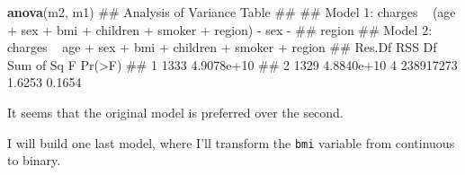 \documentclass[]{article}
\newenvironment{Shaded}{\begin{snugshade}}{\end{snugshade}}
\newcommand{\KeywordTok}[1]{\textcolor[rgb]{0.13,0.29,0.53}{\textbf{#1}}}
\newcommand{\NormalTok}[1]{#1}
\begin{document}
\begin{Shaded}
\begin{Highlighting}[]
\KeywordTok{anova}\NormalTok{(m2, m1)}
\NormalTok{## Analysis of Variance Table}
\NormalTok{## }
\NormalTok{## Model 1: charges ~ (age + sex + bmi + children + smoker + region) - sex - }
\NormalTok{##     region}
\NormalTok{## Model 2: charges ~ age + sex + bmi + children + smoker + region}
\NormalTok{##   Res.Df        RSS Df Sum of Sq      F Pr(>F)}
\NormalTok{## 1   1333 4.9078e+10                           }
\NormalTok{## 2   1329 4.8840e+10  4 238917273 1.6253 0.1654}
\end{Highlighting}
\end{Shaded}

It seems that the original model is preferred over the second.

I will build one last model, where I'll transform the \texttt{bmi}
variable from continuous to binary.
\end{document}
